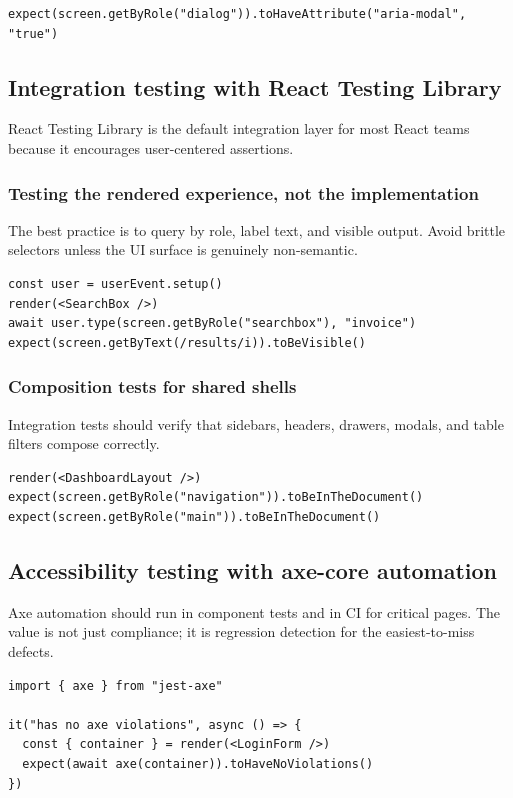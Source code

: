 \begin{verbatim}
expect(screen.getByRole("dialog")).toHaveAttribute("aria-modal", "true")
\end{verbatim}

\subsection{Integration testing with React Testing Library}
React Testing Library is the default integration layer for most React teams because it encourages user-centered assertions.

\subsubsection{Testing the rendered experience, not the implementation}
The best practice is to query by role, label text, and visible output. Avoid brittle selectors unless the UI surface is genuinely non-semantic.

\begin{verbatim}
const user = userEvent.setup()
render(<SearchBox />)
await user.type(screen.getByRole("searchbox"), "invoice")
expect(screen.getByText(/results/i)).toBeVisible()
\end{verbatim}

\subsubsection{Composition tests for shared shells}
Integration tests should verify that sidebars, headers, drawers, modals, and table filters compose correctly.

\begin{verbatim}
render(<DashboardLayout />)
expect(screen.getByRole("navigation")).toBeInTheDocument()
expect(screen.getByRole("main")).toBeInTheDocument()
\end{verbatim}

\subsection{Accessibility testing with axe-core automation}
Axe automation should run in component tests and in CI for critical pages. The value is not just compliance; it is regression detection for the easiest-to-miss defects.

\begin{verbatim}
import { axe } from "jest-axe"

it("has no axe violations", async () => {
  const { container } = render(<LoginForm />)
  expect(await axe(container)).toHaveNoViolations()
})
\end{verbatim}

